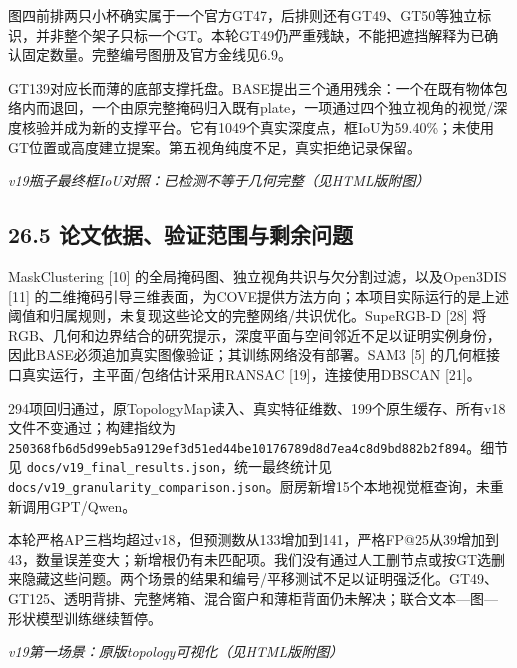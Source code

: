 \documentclass[UTF8,fontset=fandol]{ctexart}
\begin{document}
图四前排两只小杯确实属于一个官方GT47，后排则还有GT49、GT50等独立标识，并非整个架子只标一个GT。本轮GT49仍严重残缺，不能把遮挡解释为已确认固定数量。完整编号图册及官方金线见6.9。



GT139对应长而薄的底部支撑托盘。BASE提出三个通用残余：一个在既有物体包络内而退回，一个由原完整掩码归入既有plate，一项通过四个独立视角的视觉/深度核验并成为新的支撑平台。它有1049个真实深度点，框IoU为59.40\%；未使用GT位置或高度建立提案。第五视角纯度不足，真实拒绝记录保留。



\textit{v19瓶子最终框IoU对照：已检测不等于几何完整（见HTML版附图）}



\subsection*{26.5 论文依据、验证范围与剩余问题}

MaskClustering [10] 的全局掩码图、独立视角共识与欠分割过滤，以及Open3DIS [11] 的二维掩码引导三维表面，为COVE提供方法方向；本项目实际运行的是上述阈值和归属规则，未复现这些论文的完整网络/共识优化。SupeRGB-D [28] 将RGB、几何和边界结合的研究提示，深度平面与空间邻近不足以证明实例身份，因此BASE必须追加真实图像验证；其训练网络没有部署。SAM3 [5] 的几何框接口真实运行，主平面/包络估计采用RANSAC [19]，连接使用DBSCAN [21]。



294项回归通过，原TopologyMap读入、真实特征维数、199个原生缓存、所有v18文件不变通过；构建指纹为 \texttt{250368fb6d5d99eb5a9129ef3d51ed44be10176789d8d7ea4c8d9bd882b2f894}。细节见 \texttt{docs/\allowbreak{}v19\_\allowbreak{}final\_\allowbreak{}results.\allowbreak{}json}，统一最终统计见 \texttt{docs/\allowbreak{}v19\_\allowbreak{}granularity\_\allowbreak{}comparison.\allowbreak{}json}。厨房新增15个本地视觉框查询，未重新调用GPT/Qwen。



本轮严格AP三档均超过v18，但预测数从133增加到141，严格FP@25从39增加到43，数量误差变大；新增根仍有未匹配项。我们没有通过人工删节点或按GT选删来隐藏这些问题。两个场景的结果和编号/平移测试不足以证明强泛化。GT49、GT125、透明背排、完整烤箱、混合窗户和薄柜背面仍未解决；联合文本—图—形状模型训练继续暂停。



\textit{v19第一场景：原版topology可视化（见HTML版附图）}
\end{document}
